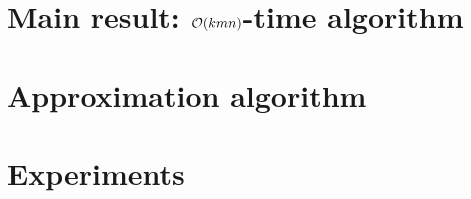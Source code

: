 \section{Main result: \texorpdfstring{$\mathcal{O}(kmn)$}{Okm}-time algorithm}
\label{dtw:sec:block}

\section{Approximation algorithm}
\label{dtw:sec:approx}

\section{Experiments}\label{dtw:sec:experiments}


\BiblatexSplitbibDefernumbersWarningOff

\backmatter
\printbibliography[segment=\therefsegment,heading=subbibintoc]